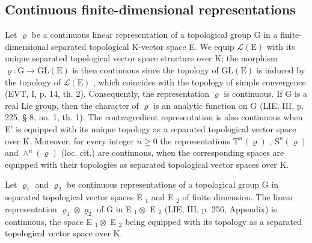 \subsection{Continuous finite-dimensional representations}

Let \(\varrho\) be a continuous linear representation of a topological group G in a finite-dimensional separated topological K-vector space E. We equip \(\mathcal{L}(\mathrm{E})\) with its unique separated topological vector space structure over K; the morphism \(\varrho\colon\mathrm{G}\to\mathrm{GL}(\mathrm{E})\) is then continuous since the topology of \(\mathrm{GL}(\mathrm{E})\) is induced by the topology of \(\mathcal{L}(\mathrm{E})\) , which coincides with the topology of simple convergence (EVT, I, p. 14, th. 2). Consequently, the representation \(\varrho\) is continuous. If G is a real Lie group, then the character of \(\varrho\) is an analytic function on G (LIE, III, p. 225, § 8, no. 1, th. 1). The contragredient representation is also continuous when E' is equipped with its unique topology as a separated topological vector space over K. Moreover, for every integer \(n\geqslant0\) the representations \(\mathrm{T}^{n}(\varrho)\) , \(\mathrm{S}^{n}(\varrho)\) and \(\wedge^{n}(\varrho)\) (loc. cit.) are continuous, when the corresponding spaces are equipped with their topologies as separated topological vector spaces over K.

Let \(\varrho_{1}\) and \(\varrho_{2}\) be continuous representations of a topological group G in separated topological vector spaces E \(_{1}\) and E \(_{2}\) of finite dimension. The linear representation \(\varrho_{1} \otimes \varrho_{2}\) of G in E \(_{1} \otimes\) E \(_{2}\) (LIE, III, p. 256, Appendix) is continuous, the space E \(_{1} \otimes\) E \(_{2}\) being equipped with its topology as a separated topological vector space over K.

